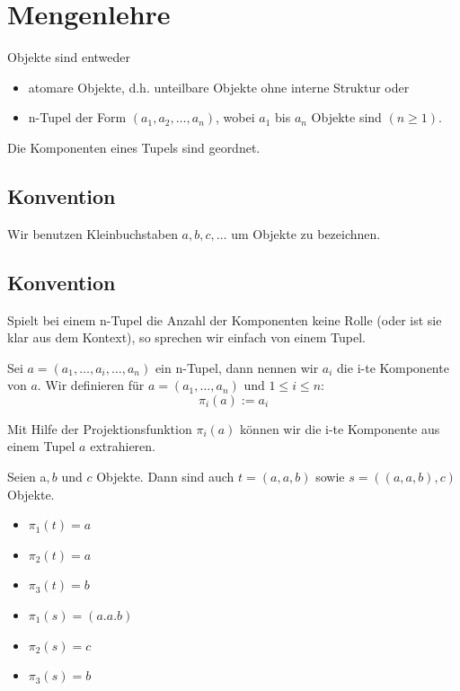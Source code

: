 \documentclass[../DatenbankenFS23.tex]{subfiles}
\begin{document}
\section{Mengenlehre}
\begin{defn}
Objekte sind entweder
\begin{itemize}
    \item atomare Objekte, d.h. unteilbare Objekte ohne interne Struktur oder 
    \item n-Tupel der Form $(a_1, a_2, \dots , a_n)$, wobei $a_1$ bis $a_n$ Objekte sind $(n\geq 1)$.
\end{itemize}
Die Komponenten eines Tupels sind geordnet.
\end{defn}
\subsection*{Konvention}
Wir benutzen Kleinbuchstaben $a, b, c, \dots$ um Objekte zu bezeichnen.
\subsection*{Konvention}
Spielt bei einem n-Tupel die Anzahl der Komponenten keine Rolle (oder ist
sie klar aus dem Kontext), so sprechen wir einfach von einem Tupel.

\begin{defn}
Sei $a = (a_1, \dots , a_i, \dots , a_n)$ ein n-Tupel, dann nennen wir $a_i$ die i-te
Komponente von $a$.
Wir definieren f\"ur $a = (a_1, \dots , a_n)$ und $1 \leq i \leq n$:
\[\pi_i(a) := a_i\]

Mit Hilfe der Projektionsfunktion $\pi_i(a)$ k\"onnen wir die i-te Komponente
aus einem Tupel $a$ extrahieren.
\end{defn}

\begin{beispiel}
 Seien a$, b$ und $c$ Objekte. Dann sind auch
$t = (a, a, b)$ sowie $s = ((a, a, b), c)$
Objekte.
\begin{itemize}
    \item $\pi_1(t) = a$
    \item $\pi_2(t) = a$
    \item $\pi_3(t) = b$
    \item $\pi_1(s) = (a.a.b)$
    \item $\pi_2(s) = c$
    \item $\pi_3(s) = b$
\end{itemize}
\end{beispiel}
\end{document}
